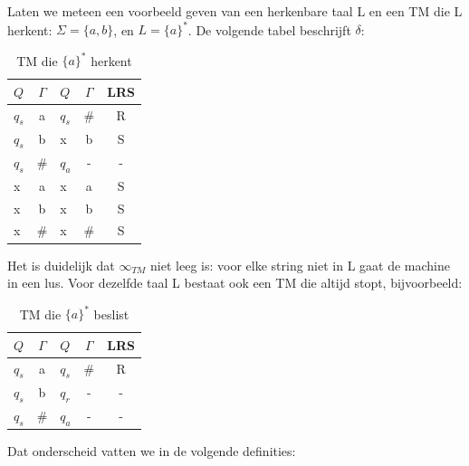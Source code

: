 

Laten we meteen een voorbeeld geven van een herkenbare taal L en een
TM die L herkent: $\Sigma = \{a,b\}$, en $L = \{a\}^*$. De volgende
tabel beschrijft $\delta$:

\begin{table}[ht]
\center
\begin{tabular}{|l|c||l|c|c|}
\hline
$Q$    & $\Gamma$   &  $Q$  &  $\Gamma$ &  LRS \\ \hline
$q_s$  &  a         &  $q_s$&   \#      &  R   \\ 
$q_s$  &  b         &  x    &    b      &  S   \\ 
$q_s$  &  \#        &  $q_a$&    -      &  -   \\ 
x      &  a         &  x    &    a      &  S   \\ 
x      &  b         &  x    &    b      &  S   \\ 
x      &  \#        &  x    &    \#     &  S   \\ 
\hline
\end{tabular}
\caption{TM die $\{a\}^*$ herkent} \label{turing3}
\end{table}
Het is duidelijk dat $\infty_{TM}$ niet leeg is: voor elke string niet
in L gaat de machine in een lus. Voor dezelfde taal L bestaat ook een
TM die altijd stopt, bijvoorbeeld:

\begin{table}[ht]
\center
\begin{tabular}{|l|c||l|c|c|}
\hline
$Q$    & $\Gamma$   &  $Q$  &  $\Gamma$ &  LRS \\ \hline
$q_s$  &  a         &  $q_s$&   \#      &  R   \\ 
$q_s$  &  b         &  $q_r$&    -      &  -   \\ 
$q_s$  &  \#        &  $q_a$&    -      &  -   \\ 
\hline
\end{tabular}
\caption{TM die $\{a\}^*$ beslist} \label{turing4}
\end{table}

Dat onderscheid vatten we in de volgende definities:



